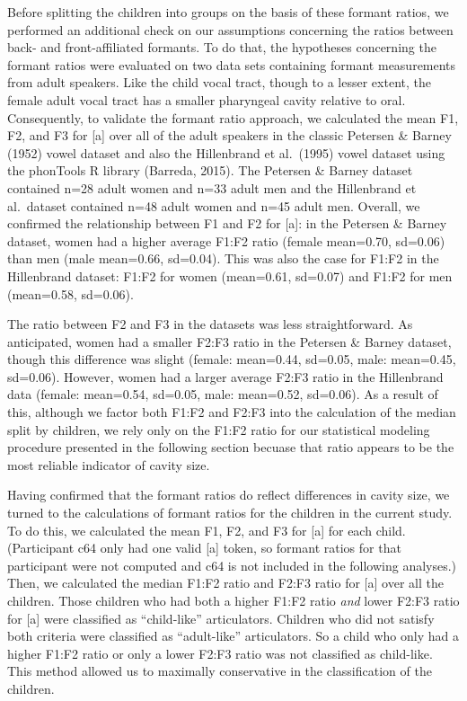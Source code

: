 \documentclass[
]{article}
\begin{document}
Before splitting the children into groups on the basis of these formant ratios, we performed an additional check on our assumptions concerning the ratios between back- and front-affiliated formants. To do that, the hypotheses concerning the formant ratios were evaluated on two data sets containing formant measurements from adult speakers. Like the child vocal tract, though to a lesser extent, the female adult vocal tract has a smaller pharyngeal cavity relative to oral. Consequently, to validate the formant ratio approach, we calculated the mean F1, F2, and F3 for {[}a{]} over all of the adult speakers in the classic Petersen \& Barney (1952) vowel dataset and also the Hillenbrand et al.~(1995) vowel dataset using the phonTools R library (Barreda, 2015). The Petersen \& Barney dataset contained n=28 adult women and n=33 adult men and the Hillenbrand et al.~dataset contained n=48 adult women and n=45 adult men. Overall, we confirmed the relationship between F1 and F2 for {[}a{]}: in the Petersen \& Barney dataset, women had a higher average F1:F2 ratio (female mean=0.70, sd=0.06) than men (male mean=0.66, sd=0.04). This was also the case for F1:F2 in the Hillenbrand dataset: F1:F2 for women (mean=0.61, sd=0.07) and F1:F2 for men (mean=0.58, sd=0.06).

The ratio between F2 and F3 in the datasets was less straightforward. As anticipated, women had a smaller F2:F3 ratio in the Petersen \& Barney dataset, though this difference was slight (female: mean=0.44, sd=0.05, male: mean=0.45, sd=0.06). However, women had a larger average F2:F3 ratio in the Hillenbrand data (female: mean=0.54, sd=0.05, male: mean=0.52, sd=0.06). As a result of this, although we factor both F1:F2 and F2:F3 into the calculation of the median split by children, we rely only on the F1:F2 ratio for our statistical modeling procedure presented in the following section becuase that ratio appears to be the most reliable indicator of cavity size.

Having confirmed that the formant ratios do reflect differences in cavity size, we turned to the calculations of formant ratios for the children in the current study. To do this, we calculated the mean F1, F2, and F3 for {[}a{]} for each child. (Participant c64 only had one valid {[}a{]} token, so formant ratios for that participant were not computed and c64 is not included in the following analyses.) Then, we calculated the median F1:F2 ratio and F2:F3 ratio for {[}a{]} over all the children. Those children who had both a higher F1:F2 ratio \emph{and} lower F2:F3 ratio for {[}a{]} were classified as ``child-like'' articulators. Children who did not satisfy both criteria were classified as ``adult-like'' articulators. So a child who only had a higher F1:F2 ratio or only a lower F2:F3 ratio was not classified as child-like. This method allowed us to maximally conservative in the classification of the children.
\end{document}
